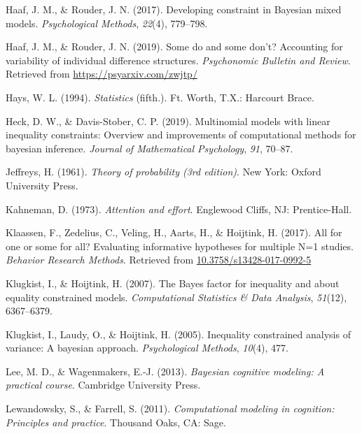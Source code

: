 \documentclass[english,,man]{apa6}
\begin{document}
\leavevmode\hypertarget{ref-Haaf:Rouder:2017}{}%
Haaf, J. M., \& Rouder, J. N. (2017). Developing constraint in Bayesian mixed models. \emph{Psychological Methods}, \emph{22}(4), 779--798.

\leavevmode\hypertarget{ref-Haaf:Rouder:2019}{}%
Haaf, J. M., \& Rouder, J. N. (2019). Some do and some don't? Accounting for variability of individual difference structures. \emph{Psychonomic Bulletin and Review}. Retrieved from \url{https://psyarxiv.com/zwjtp/}

\leavevmode\hypertarget{ref-Hays:1994}{}%
Hays, W. L. (1994). \emph{Statistics} (fifth.). Ft. Worth, T.X.: Harcourt Brace.

\leavevmode\hypertarget{ref-Heck:Davis-Stober:2019}{}%
Heck, D. W., \& Davis-Stober, C. P. (2019). Multinomial models with linear inequality constraints: Overview and improvements of computational methods for bayesian inference. \emph{Journal of Mathematical Psychology}, \emph{91}, 70--87.

\leavevmode\hypertarget{ref-Jeffreys:1961}{}%
Jeffreys, H. (1961). \emph{Theory of probability (3rd edition)}. New York: Oxford University Press.

\leavevmode\hypertarget{ref-Kahneman:1973}{}%
Kahneman, D. (1973). \emph{Attention and effort}. Englewood Cliffs, NJ: Prentice-Hall.

\leavevmode\hypertarget{ref-Klaassen:etal:2017}{}%
Klaassen, F., Zedelius, C., Veling, H., Aarts, H., \& Hoijtink, H. (2017). All for one or some for all? Evaluating informative hypotheses for multiple N=1 studies. \emph{Behavior Research Methods}. Retrieved from \url{10.3758/s13428-017-0992-5}

\leavevmode\hypertarget{ref-Klugkist:Hoijtink:2007}{}%
Klugkist, I., \& Hoijtink, H. (2007). The Bayes factor for inequality and about equality constrained models. \emph{Computational Statistics \& Data Analysis}, \emph{51}(12), 6367--6379.

\leavevmode\hypertarget{ref-Klugkist:etal:2005}{}%
Klugkist, I., Laudy, O., \& Hoijtink, H. (2005). Inequality constrained analysis of variance: A bayesian approach. \emph{Psychological Methods}, \emph{10}(4), 477.

\leavevmode\hypertarget{ref-Lee:Wagenmakers:2013}{}%
Lee, M. D., \& Wagenmakers, E.-J. (2013). \emph{Bayesian cognitive modeling: A practical course}. Cambridge University Press.

\leavevmode\hypertarget{ref-Lewandowsky:Farrell:2011}{}%
Lewandowsky, S., \& Farrell, S. (2011). \emph{Computational modeling in cognition: Principles and practice}. Thousand Oaks, CA: Sage.
\end{document}
